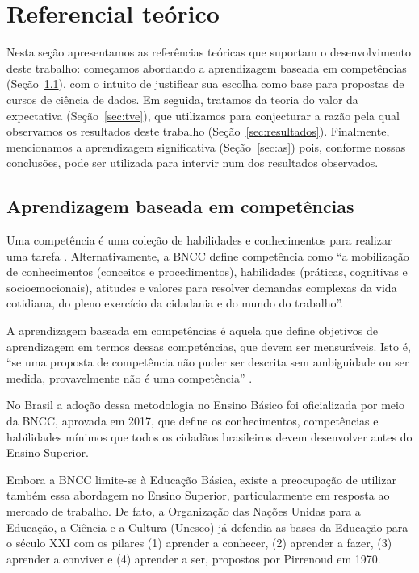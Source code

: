 \section{Referencial teórico}

Nesta seção apresentamos as referências teóricas que suportam o desenvolvimento deste trabalho: começamos abordando a aprendizagem baseada em competências ({Seção~\ref{sec:competencias}}), com o intuito de justificar sua escolha como base para propostas de cursos de ciência de dados.
Em seguida, tratamos da teoria do valor da expectativa (Seção~\ref{sec:tve}), que utilizamos para conjecturar a razão pela qual observamos os resultados deste trabalho (Seção~\ref{sec:resultados}).
Finalmente, mencionamos a aprendizagem significativa (Seção~\ref{sec:as}) pois, conforme nossas conclusões, pode ser utilizada para intervir num dos resultados observados.

\subsection{Aprendizagem baseada em competências}
\label{sec:competencias}

Uma competência é uma coleção de habilidades e conhecimentos para realizar uma tarefa \cite{Voorhees2001}.
Alternativamente, a BNCC \cite{BNCC} define competência como ``a mobilização de conhecimentos (conceitos e procedimentos), habilidades (práticas, cognitivas e socioemocionais), atitudes e valores para resolver demandas complexas da vida cotidiana, do pleno exercício da cidadania e do mundo do trabalho''.

A aprendizagem baseada em competências é aquela que define objetivos de aprendizagem em termos dessas competências, que devem ser mensuráveis.
Isto é, ``se uma proposta de competência não puder ser descrita sem ambiguidade ou ser medida, provavelmente não é uma competência'' \cite{Voorhees2001}.

No Brasil a adoção dessa metodologia no Ensino Básico foi oficializada por meio da BNCC, aprovada em 2017, que define os conhecimentos, competências e habilidades mínimos que todos os cidadãos brasileiros devem desenvolver antes do Ensino Superior.

Embora a BNCC limite-se à Educação Básica, existe a preocupação de utilizar também essa abordagem no Ensino Superior, particularmente em resposta ao mercado de trabalho.
De fato, a Organização das Nações Unidas para a Educação, a Ciência e a Cultura (Unesco) já defendia as bases da Educação para o século XXI com os pilares (1) aprender a conhecer, (2) aprender a fazer, (3) aprender a conviver e (4) aprender a ser, propostos por Pirrenoud em 1970.

